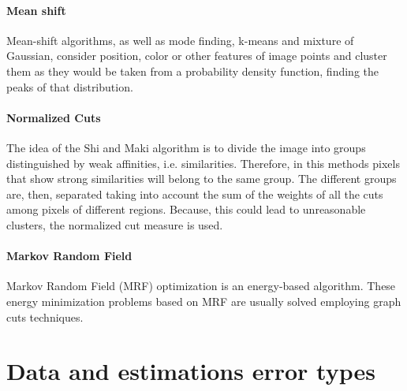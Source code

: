 \paragraph*{Mean shift}

Mean-shift algorithms, as well as mode finding, k-means and mixture of Gaussian, consider position, color or other features of image points and cluster them as they would be taken from a probability density function, finding the peaks of that distribution.\\

\paragraph*{Normalized Cuts}

The idea of the Shi and Maki algorithm \cite{shi2000normalized} is to divide the image into groups distinguished by weak affinities, i.e. similarities. 
Therefore, in this methods pixels that show strong similarities will belong to the same group. 
The different groups are, then, separated taking into account the sum of the weights of all the cuts among pixels of different regions.
Because, this could lead to unreasonable clusters, the normalized cut measure is used.\\


\paragraph*{Markov Random Field}

Markov Random Field (MRF) optimization is an energy-based algorithm.
These energy minimization problems based on MRF are usually solved employing graph cuts techniques.



\section{Data and estimations error types}
\label{section:error-types}













